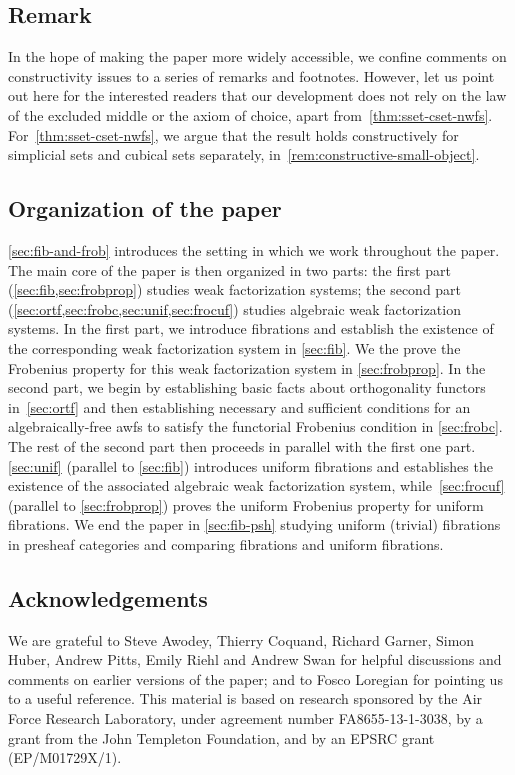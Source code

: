 \documentclass[reqno,10pt,a4paper,oneside,draft]{amsart}
\begin{document}
\subsection*{Remark}
In the hope of making the paper more widely accessible, we confine comments on constructivity issues to a series of remarks and footnotes.
However, let us point out here for the interested readers that our development does not rely on the law of the excluded middle or the axiom of choice, apart from~\cref{thm:sset-cset-nwfs}.
For~\cref{thm:sset-cset-nwfs}, we argue that the result holds constructively for simplicial sets and cubical sets separately, in~\cref{rem:constructive-small-object}.%


\subsection*{Organization of the paper} \cref{sec:fib-and-frob} introduces the setting in which we work throughout the paper. 
The main core of the paper is then organized in two parts: the first part (\cref{sec:fib,sec:frobprop}) studies weak factorization systems; the second part (\cref{sec:ortf,sec:frobc,sec:unif,sec:frocuf})
studies algebraic weak factorization systems. In the first part, we introduce fibrations and establish the existence of the corresponding weak factorization system in \cref{sec:fib}.
We the prove the Frobenius property for this weak factorization system in \cref{sec:frobprop}. In the second part, we begin 
by establishing basic facts about orthogonality functors in~\ref{sec:ortf} and then establishing necessary and sufficient conditions for an algebraically-free awfs to satisfy the functorial Frobenius condition in \ref{sec:frobc}.  The rest of the second part then proceeds in parallel with the first one part. \cref{sec:unif} (parallel to \cref{sec:fib}) introduces uniform fibrations and establishes the existence of the
associated algebraic weak factorization system, while~\cref{sec:frocuf} (parallel to \cref{sec:frobprop})  proves the uniform Frobenius property for uniform fibrations. We end the paper in \cref{sec:fib-psh} studying uniform (trivial) fibrations in presheaf categories and comparing fibrations and uniform fibrations.


\subsection*{Acknowledgements}

We are grateful to Steve Awodey, Thierry Coquand, Richard Garner, Simon Huber, Andrew Pitts, Emily Riehl and Andrew Swan for helpful discussions and comments on earlier versions of the paper; and to Fosco Loregian for pointing us to a useful reference. This material is based on research sponsored by the Air Force Research Laboratory, under agreement number FA8655-13-1-3038, by a grant from the John Templeton Foundation, and by an EPSRC grant (EP/M01729X/1).
\end{document}
